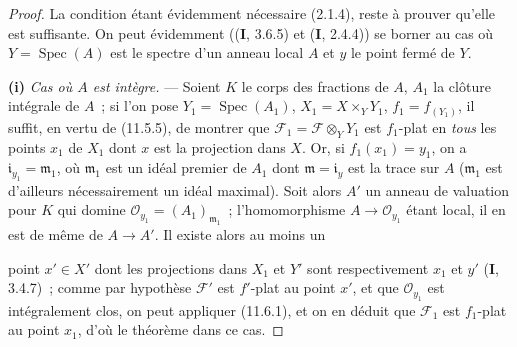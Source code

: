 \begin{proof}
La condition étant évidemment nécessaire (2.1.4), reste à prouver qu'elle est
suffisante. On peut évidemment ((\textbf I, 3.6.5) et (\textbf I, 2.4.4)) se
borner au cas où $Y=\operatorname{Spec}(A)$ est le spectre d'un anneau local $A$
et $y$ le point fermé de $Y$.

\medskip
\noindent\textbf{(i)} \emph{Cas où $A$ est intègre.} --- Soient $K$ le corps
des fractions de $A$, $A_1$ la clôture intégrale de $A$~; si l'on pose
$Y_1=\operatorname{Spec}(A_1)$, $X_1=X\times_Y Y_1$, $f_1=f_{(Y_1)}$, il suffit,
en vertu de (11.5.5), de montrer que
$\mathcal F_1=\mathcal F\otimes_Y Y_1$ est $f_1$-plat en \emph{tous} les points
$x_1$ de $X_1$ dont $x$ est la projection dans $X$. Or, si $f_1(x_1)=y_1$, on a
$\mathfrak i_{y_1}=\mathfrak m_1$, où $\mathfrak m_1$ est un idéal premier de
$A_1$ dont $\mathfrak m=\mathfrak i_y$ est la trace sur $A$ ($\mathfrak m_1$
est d'ailleurs nécessairement un idéal maximal). Soit alors $A'$ un anneau de
valuation pour $K$ qui domine $\mathcal O_{y_1}=(A_1)_{\mathfrak m_1}$~;
l'homomorphisme $A\to\mathcal O_{y_1}$ étant local, il en est de même de
$A\to A'$. Il existe alors au moins un


point $x'\in X'$ dont les projections dans $X_1$ et $Y'$ sont respectivement
$x_1$ et $y'$ (\textbf I, 3.4.7)~; comme par hypothèse $\mathcal F'$ est
$f'$-plat au point $x'$, et que $\mathcal O_{y_1}$ est intégralement clos, on
peut appliquer (11.6.1), et on en déduit que $\mathcal F_1$ est $f_1$-plat au
point $x_1$, d'où le théorème dans ce cas.


\end{proof}
